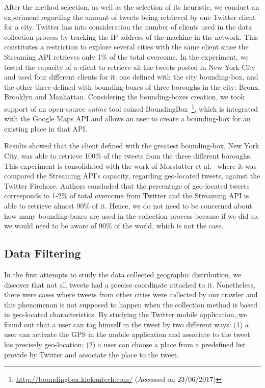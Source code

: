 After the method selection, as well as the selection of its heuristic, we conduct an experiment regarding the amount of tweets being retrieved by one Twitter client for a city. Twitter has into consideration the number of clients used in the data collection process by tracking the IP address of the machine in the network. This constitutes a restriction to explore several cities with the same client since the Streaming \gls{API} retrieves only 1\% of the total overcome. In the experiment, we tested the capacity of a client to retrieve all the tweets posted in New York City and used four different clients for it: one defined with the city bounding-box, and the other three defined with bounding-boxes of three boroughs in the city: Bronx, Brooklyn and Manhattan. Considering the bounding-boxes creation, we took support of an open-source \textit{online} tool coined BoundingBox~\footnote{\url{http://boundingbox.klokantech.com/} (Accessed on 23/06/2017)}, which is integrated with the Google Maps \gls{API} and allows an user to create a bounding-box for an existing place in that \gls{API}.

Results showed that the client defined with the greatest bounding-box, New York City, was able to retrieve 100\% of the tweets from the three different boroughs. This experiment is consolidated with the work of Morstatter et al.~\cite{morstatter2013sample} where it was compared the Streaming \gls{API}'s capacity, regarding geo-located tweets, against the Twitter Firehose. Authors concluded that the percentage of geo-located tweets corresponds to 1-2\% of total overcome from Twitter and the Streaming \gls{API} is able to retrieve almost 90\% of it. Hence, we do not need to be concerned about how many bounding-boxes are used in the collection process because if we did so, we would need to be aware of 90\% of the world, which is not the case.

\subsection{Data Filtering}
\label{subsec:data_filtering}
In the first attempts to study the data collected geographic distribution, we discover that not all tweets had a precise coordinate attached to it. Nonetheless, there were cases where tweets from other cities were collected by our crawler and this phenomenon is not supposed to happen when the collection method is based in geo-located characteristics. By studying the Twitter mobile application, we found out that a user can tag himself in the tweet by two different ways: (1) a user can activate the \gls{GPS} in the mobile application and associate to the tweet his precisely geo-location; (2) a user can choose a place from a predefined list provide by Twitter and associate the place to the tweet.

